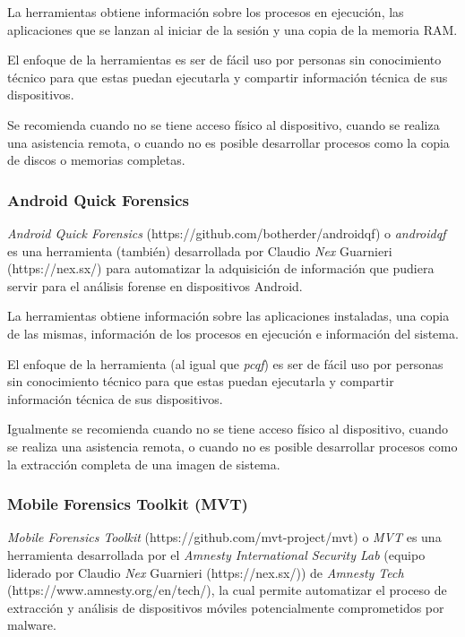 \documentclass[12pt]{caltech_thesis}
\begin{document}
La herramientas obtiene información sobre los procesos en ejecución, las aplicaciones que se lanzan al iniciar de la sesión y una copia de la memoria RAM. 

El enfoque de la herramientas es ser de fácil uso por personas sin conocimiento técnico para que estas puedan ejecutarla y compartir información técnica de sus dispositivos.

Se recomienda cuando no se tiene acceso físico al dispositivo, cuando se realiza una asistencia remota, o cuando no es posible desarrollar procesos como la copia de discos o memorias completas.

\subsubsection{Android Quick Forensics}

\textit{Android Quick Forensics} (https://github.com/botherder/androidqf) o \textit{androidqf} es una herramienta (también) desarrollada por Claudio \textit{Nex} Guarnieri (https://nex.sx/) para automatizar la adquisición de información que pudiera servir para el análisis forense en dispositivos Android.

La herramientas obtiene información sobre las aplicaciones instaladas, una copia de las mismas, información de los procesos en ejecución e información del sistema.

El enfoque de la herramienta (al igual que \textit{pcqf}) es ser de fácil uso por personas sin conocimiento técnico para que estas puedan ejecutarla y compartir información técnica de sus dispositivos.

Igualmente se recomienda cuando no se tiene acceso físico al dispositivo, cuando se realiza una asistencia remota, o cuando no es posible desarrollar procesos como la extracción completa de una imagen de sistema.

\subsubsection{Mobile Forensics Toolkit (MVT)}

\textit{Mobile Forensics Toolkit} (https://github.com/mvt-project/mvt) o \textit{MVT} es una herramienta desarrollada por el \textit{Amnesty International Security Lab} (equipo liderado por Claudio \textit{Nex} Guarnieri (https://nex.sx/)) de \textit{Amnesty Tech} (https://www.amnesty.org/en/tech/), la cual permite automatizar el proceso de extracción y análisis de dispositivos móviles potencialmente comprometidos por malware.
\end{document}
